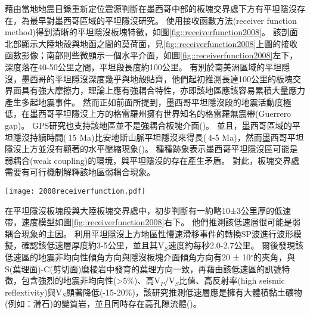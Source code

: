 \citealp{pardo1995}藉由當地地震目錄重新定位震源判斷在墨西哥中部的板塊交界處下方有平坦隱沒存在，為最早對墨西哥區域的平坦隱沒研究。
\citealp{PerezCampos2008}使用接收函數方法(receiver function method)得到清晰的平坦隱沒板塊特徵，如圖\ref{fig::receiverfunction2008}。
該剖面北部顯示大陸地殼與地函之間的莫荷面，見\ref{fig::receiverfunction2008}上圖的接收函數影像；南部則些微顯示一個水平介面，如圖\ref{fig::receiverfunction2008}左下，深度落在40-50公里之間，平坦段長度約100公里。
有別於南美洲區域的平坦隱沒，墨西哥的平坦隱沒深度幾乎與地殼貼齊，他們起初推測長達100公里的板塊交界面具有強大摩擦力，理論上應有強耦合特性，亦即該地區應該容易累積大量應力產生多起地震事件。
然而正如前面所提到，墨西哥平坦隱沒段的地震活動度極低，在墨西哥平坦隱沒上方的格雷羅州擁有世界知名的格雷羅無震帶(Guerrero gap)。
GPS研究也支持該地區並不是強耦合板塊介面(\citealp{nieto2006latest})。
並且，墨西哥區域的平坦隱沒持續時間($~$15 Ma)比安地斯山脈平坦隱沒來得長($~$4-5 Ma)，然而墨西哥平坦隱沒上方並沒有顯著的水平壓縮現象(\citealp{moran2007cenozoic})。
種種跡象表示墨西哥平坦隱沒區可能是弱耦合(weak coupling)的環境，與平坦隱沒的存在產生矛盾。
對此，板塊交界處需要有可行機制解釋該地區弱耦合現象。

\begin{figure*}[ht!]
    \centering
    \texttt{[image: 2008receiverfunction.pdf]}
    \caption[墨西哥平坦隱沒區域接收函數結果，摘自\citealp{PerezCampos2008}]{墨西哥平坦隱沒區域接收函數結果，摘自\citealp{PerezCampos2008}。
    (a)中黑色三角形表示測站沿剖面的位置，高程被放大10倍。
    粗棕色線表示跨墨西哥火山帶(TMVB, Trans-Mexican Volcanic Belt)的範圍。
    接收函數影像中標出沿剖面50公里範圍內的震源(粉紅色點來自SSN地震目錄；綠色點來自\citealp{pardo1995}重新定位結果)位置。
    (b)顯示沿平坦隱沒板塊的一次遠震事件的接收函數。
    (c)說明了相應的模型(LVM (low velocity mantle) = 低速地函和 OC (oceanic crust) = 海洋地殼)。
    (d)根據左下圖接收函數模型中A、B和C位置上的P波速度模型。
    }
    \label{fig::receiverfunction2008}
\end{figure*}

\citealp{PerezCampos2008}在平坦隱沒板塊段與大陸板塊交界處中，初步判斷有一約略10±3公里厚的低速帶，速度模型如圖\ref{fig::receiverfunction2008}右下。
他們推測該低速層很可能是弱耦合現象的主因。
\citealp{Song2009}利用平坦隱沒上方地區性慢速滑移事件的轉換SP波進行波形模擬，確認該低速層厚度約3-5公里，並且其V$_S$速度約每秒2.0-2.7公里。
爾後\citealp{Song2012SC}發現該低速區的地震非均向性傾角方向與隱沒板塊介面傾角方向有20 ± 10$^{\circ}$的夾角，與S(葉理面)-C(剪切面)糜棱岩中發育的葉理方向一致，再藉由該低速區的訊號特徵，包含強烈的地震非均向性(>5$\%$)、高V$_P$/V$_S$比值、高反射率(high seismic reflextivity)與V$_S$顯著降低(-15-20$\%$)，該研究推測低速層應是擁有大體積黏土礦物(例如：滑石)的變質岩，並且同時存在高孔隙流體(\citealp{Kim2012})。

